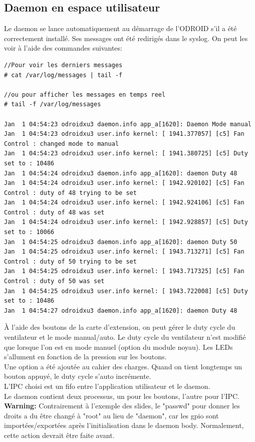 \subsection{Daemon en espace utilisateur}
Le daemon se lance automatiquement au démarrage de l'ODROID s'il a été correctement installé. Ses messages ont été redirigés dans le syslog. On peut les voir à l'aide des commandes suivantes:
\begin{lstlisting}
//Pour voir les derniers messages
# cat /var/log/messages | tail -f

//ou pour afficher les messages en temps reel
# tail -f /var/log/messages

Jan  1 04:54:23 odroidxu3 daemon.info app_a[1620]: Daemon Mode manual
Jan  1 04:54:23 odroidxu3 user.info kernel: [ 1941.377057] [c5] Fan Control : changed mode to manual
Jan  1 04:54:23 odroidxu3 user.info kernel: [ 1941.380725] [c5] Duty set to : 10486
Jan  1 04:54:24 odroidxu3 daemon.info app_a[1620]: daemon Duty 48
Jan  1 04:54:24 odroidxu3 user.info kernel: [ 1942.920102] [c5] Fan Control : duty of 48 trying to be set
Jan  1 04:54:24 odroidxu3 user.info kernel: [ 1942.924106] [c5] Fan Control : duty of 48 was set
Jan  1 04:54:24 odroidxu3 user.info kernel: [ 1942.928857] [c5] Duty set to : 10066
Jan  1 04:54:25 odroidxu3 daemon.info app_a[1620]: daemon Duty 50
Jan  1 04:54:25 odroidxu3 user.info kernel: [ 1943.713271] [c5] Fan Control : duty of 50 trying to be set
Jan  1 04:54:25 odroidxu3 user.info kernel: [ 1943.717325] [c5] Fan Control : duty of 50 was set
Jan  1 04:54:25 odroidxu3 user.info kernel: [ 1943.722008] [c5] Duty set to : 10486
Jan  1 04:54:27 odroidxu3 daemon.info app_a[1620]: daemon Duty 48
\end{lstlisting}

À l'aide des boutons de la carte d'extension, on peut gérer le duty cycle du ventilateur et le mode manual/auto. Le duty cycle du ventilateur n'est modifié que lorsque l'on est en mode manuel (option du module noyau). Les LEDs s'allument en fonction de la pression sur les boutons.\\
Une option a été ajoutée au cahier des charges. Quand on tient longtemps un bouton appuyé, le duty cycle s'auto incrémente.\\
L'IPC choisi est un fifo entre l'application utilisateur et le daemon.\\
Le daemon contient deux processus, un pour les boutons, l'autre pour l'IPC.\\
\textbf{Warning: } Contrairement à l'exemple des slides, le "passwd" pour donner les droits a du être changé à "root" au lieu de "daemon", car les gpio sont importées/exportées après l'initialisation dans le daemon body. Normalement, cette action devrait être faite avant.

